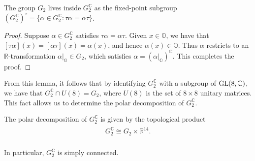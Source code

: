 \noindent\begin{lemma}\label{CompactSubgroup} The group $G_2$ lives inside $G_2^\mathbb{C}$ as the fixed-point subgroup $(G_2^\mathbb{C})^\tau = \{\alpha \in G_2^\mathbb{C} : \tau\alpha = \alpha\tau\}$.\\
\end{lemma}

\noindent\begin{proof} Suppose $\alpha \in G_2^\mathbb{C}$ satisfies $\tau\alpha = \alpha\tau$. Given $x \in \mathbb{O}$, we have that $[\tau\alpha](x) = [\alpha\tau](x) = \alpha(x)$, and hence $\alpha(x) \in \mathbb{O}$. Thus $\alpha$ restricts to an $\mathbb{R}$-transformation $\alpha\vert_\mathbb{O} \in G_2$, which satisfies $\alpha = (\alpha\vert_\mathbb{O})^\mathbb{C}$. This completes the proof.
\end{proof}\newpage

\noindent From this lemma, it follows that by identifying $G_2^\mathbb{C}$ with a subgroup of $\textup{GL}(8, \mathbb{C})$, we have that $G_2^\mathbb{C} \cap U(8) = G_2$, where $U(8)$ is the set of $8 \times 8$ unitary matrices. This fact allows us to determine the polar decomposition of $G_2^\mathbb{C}$.\\

\noindent\begin{theorem}\label{PolarDecomposition} The polar decomposition of $G_2^\mathbb{C}$ is given by the topological product
\begin{align*}
\begin{split}
G_2^\mathbb{C} \cong G_2 \times \mathbb{R}^{14}.
\end{split}
\end{align*}
\noindent\\[-1.25\linespacing] In particular, $G_2^\mathbb{C}$ is simply connected.\\
\end{theorem}

